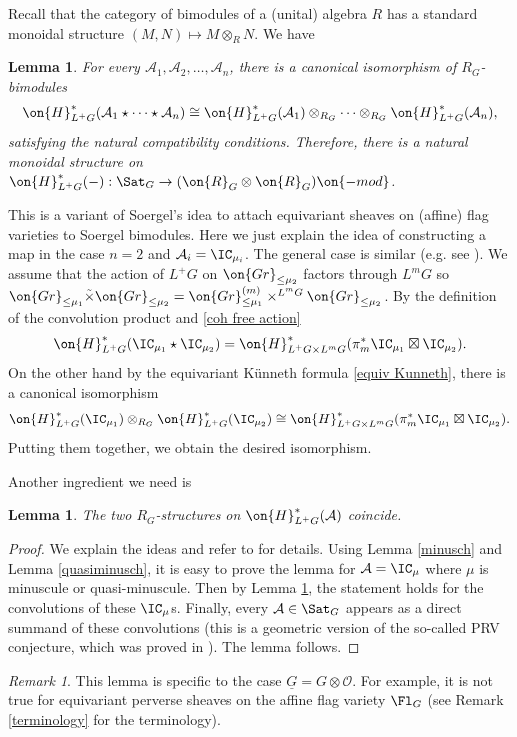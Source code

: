 \documentclass[]{pcmi}
\theoremstyle{plain}
\newtheorem{lem}[equation]{Lemma}
\theoremstyle{remark}
\newtheorem{rmk}[equation]{Remark}
\theoremstyle{definition}
\newcommand{\mA}{{\mathcal A}}
\newcommand{\mO}{{\mathcal O}}
\newcommand{\Gr}{{\on{Gr}}}
\begin{document}
Recall that the category of bimodules of a (unital) algebra $R$ has a standard monoidal structure $(M,N)\mapsto M\otimes_RN$. We have
\begin{lem}\label{soergel monoidal}
For every $\mA_1,\mA_2,\ldots,\mA_n$, there is a canonical isomorphism of $R_{G}$-bimodules
\[\on{H}^*_{L^+G}(\mA_1\star\cdots\star\mA_n)\cong \on{H}^*_{L^+G}(\mA_1)\otimes_{R_{G}}\cdots\otimes_{R_{G}}\on{H}^*_{L^+G}(\mA_n),\]
satisfying the natural compatibility conditions. Therefore, there is a natural monoidal structure on $\on{H}^*_{L^+G}(-):\Sat_G\to (\on{R}_{G}\otimes\on{R}_{G})\on{-mod}$. 
\end{lem}
This is a variant of Soergel's idea to attach equivariant sheaves on (affine) flag varieties to Soergel bimodules. Here we just explain the idea of constructing a map in the case $n=2$ and $\mA_i=\IC_{\mu_i}$. The general case is similar (e.g. see \cite[\S~2.3]{Z14}). We assume that the action of $L^+G$ on $\Gr_{\leq \mu_2}$ factors through $L^mG$ so $\Gr_{\leq \mu_1}\tilde\times\Gr_{\leq \mu_2}= \Gr_{\leq\mu_1}^{(m)}\times^{L^mG}\Gr_{\leq \mu_2}$. By the definition of the convolution product and \eqref{coh free action}
\[\on{H}^*_{L^+G}(\IC_{\mu_1}\star\IC_{\mu_2})=\on{H}^*_{L^+G\times L^mG}(\pi_m^*\IC_{\mu_1}\boxtimes \IC_{\mu_2}).\]
On the other hand by the equivariant K\"unneth formula \eqref{equiv Kunneth}, there is a canonical isomorphism
\[\on{H}^*_{L^+G}(\IC_{\mu_1})\otimes_{R_{G}} \on{H}^*_{L^+G}(\IC_{\mu_2})\cong \on{H}^*_{L^+G\times L^mG}(\pi_m^*\IC_{\mu_1}\boxtimes \IC_{\mu_2}).\]
Putting them together, we obtain the desired isomorphism.

Another ingredient we need is
\begin{lem}\label{left=right}
The two $R_{G}$-structures on $\on{H}^*_{L^+G}(\mA)$ coincide.
\end{lem}
\begin{proof}We explain the ideas and refer to \cite[\S\ 2.3]{Z14} for details. Using Lemma \ref{minusch} and Lemma \ref{quasiminusch}, it is easy to prove the lemma for $\mA=\IC_\mu$ where $\mu$ is minuscule or quasi-minuscule. Then by Lemma \ref{soergel monoidal}, the statement holds for the convolutions of these $\IC_\mu$s. Finally, every $\mA\in\Sat_G$ appears as a direct summand of these convolutions (this is a geometric version of the so-called PRV conjecture, which was proved in \cite[Proposition 9.6]{NP}). The lemma follows.\end{proof}


\begin{rmk}
This lemma is specific to the case $\underline G=G\otimes \mO$. For example, it is not true for equivariant perverse sheaves on the affine flag variety $\Fl_G$ (see Remark \ref{terminology} for the terminology).
\end{rmk}
\end{document}
